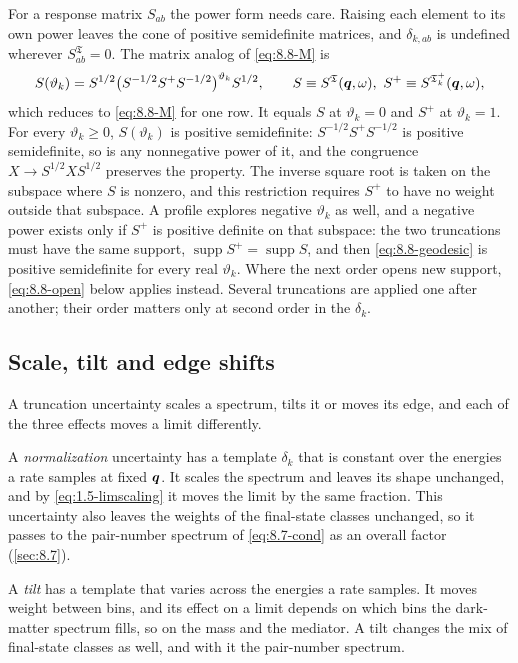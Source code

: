 For a response matrix $S_{ab}$ the power form needs care. Raising each element to its own power leaves the cone of positive semidefinite matrices, and $\delta_{k,ab}$ is undefined wherever $S^{\mathfrak{T}}_{ab} = 0$. The matrix analog of \cref{eq:8.8-M} is
\begin{equation}
  S(\vartheta_k) = S^{1/2}\bigl(S^{-1/2}S^+S^{-1/2}\bigr)^{\vartheta_k}S^{1/2} , \qquad S \equiv S^{\mathfrak{T}}(\bm{q},\omega),\ S^+ \equiv S^{\mathfrak{T}_k^+}(\bm{q},\omega) ,
  \label{eq:8.8-geodesic}
\end{equation}
which reduces to \cref{eq:8.8-M} for one row. It equals $S$ at $\vartheta_k = 0$ and $S^+$ at $\vartheta_k = 1$. For every $\vartheta_k \ge 0$, $S(\vartheta_k)$ is positive semidefinite: $S^{-1/2}S^+S^{-1/2}$ is positive semidefinite, so is any nonnegative power of it, and the congruence $X \to S^{1/2}XS^{1/2}$ preserves the property. The inverse square root is taken on the subspace where $S$ is nonzero, and this restriction requires $S^+$ to have no weight outside that subspace. A profile explores negative $\vartheta_k$ as well, and a negative power exists only if $S^+$ is positive definite on that subspace: the two truncations must have the same support, $\operatorname{supp}S^+ = \operatorname{supp}S$, and then \cref{eq:8.8-geodesic} is positive semidefinite for every real $\vartheta_k$. Where the next order opens new support, \cref{eq:8.8-open} below applies instead. Several truncations are applied one after another; their order matters only at second order in the $\delta_k$.

\subsection{Scale, tilt and edge shifts}

A truncation uncertainty scales a spectrum, tilts it or moves its edge, and each of the three effects moves a limit differently.

A \emph{normalization} uncertainty has a template $\delta_k$ that is constant over the energies a rate samples at fixed $\bm{q}$. It scales the spectrum and leaves its shape unchanged, and by \cref{eq:1.5-limscaling} it moves the limit by the same fraction. This uncertainty also leaves the weights of the final-state classes unchanged, so it passes to the pair-number spectrum of \cref{eq:8.7-cond} as an overall factor (\cref{sec:8.7}).

A \emph{tilt} has a template that varies across the energies a rate samples. It moves weight between bins, and its effect on a limit depends on which bins the dark-matter spectrum fills, so on the mass and the mediator. A tilt changes the mix of final-state classes as well, and with it the pair-number spectrum.

